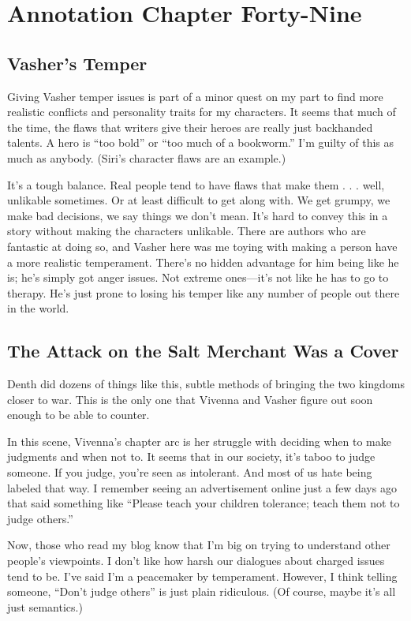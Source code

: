 \section{Annotation Chapter Forty-Nine}

\subsection*{Vasher’s Temper}

Giving Vasher temper issues is part of a minor quest on my part to find more realistic conflicts and personality traits for my characters. It seems that much of the time, the flaws that writers give their heroes are really just backhanded talents. A hero is “too bold” or “too much of a bookworm.” I’m guilty of this as much as anybody. (Siri’s character flaws are an example.)

It’s a tough balance. Real people tend to have flaws that make them . . . well, unlikable sometimes. Or at least difficult to get along with. We get grumpy, we make bad decisions, we say things we don’t mean. It’s hard to convey this in a story without making the characters unlikable. There are authors who are fantastic at doing so, and Vasher here was me toying with making a person have a more realistic temperament. There’s no hidden advantage for him being like he is; he’s simply got anger issues. Not extreme ones—it’s not like he has to go to therapy. He’s just prone to losing his temper like any number of people out there in the world.

\subsection*{The Attack on the Salt Merchant Was a Cover}

Denth did dozens of things like this, subtle methods of bringing the two kingdoms closer to war. This is the only one that Vivenna and Vasher figure out soon enough to be able to counter.

In this scene, Vivenna’s chapter arc is her struggle with deciding when to make judgments and when not to. It seems that in our society, it’s taboo to judge someone. If you judge, you’re seen as intolerant. And most of us hate being labeled that way. I remember seeing an advertisement online just a few days ago that said something like “Please teach your children tolerance; teach them not to judge others.”

Now, those who read my blog know that I’m big on trying to understand other people’s viewpoints. I don’t like how harsh our dialogues about charged issues tend to be. I’ve said I’m a peacemaker by temperament. However, I think telling someone, “Don’t judge others” is just plain ridiculous. (Of course, maybe it’s all just semantics.)

